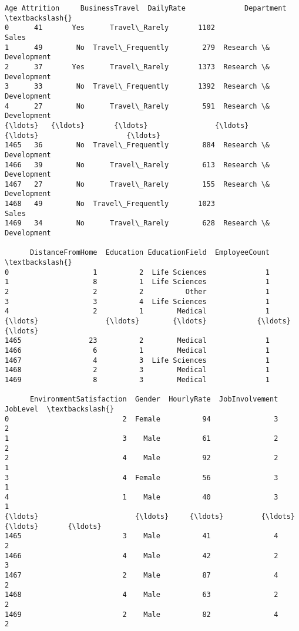 \documentclass[11pt]{article}
\makeatletter
\newcommand{\boxspacing}{\kern\kvtcb@left@rule\kern\kvtcb@boxsep}
\newcommand{\prompt}[4]{
        {\ttfamily\llap{{\color{#2}[#3]:\hspace{3pt}#4}}\vspace{-\baselineskip}}
    }
\makeatother
\begin{document}
            \begin{tcolorbox}[breakable, size=fbox, boxrule=.5pt, pad at break*=1mm, opacityfill=0]
\prompt{Out}{outcolor}{84}{\boxspacing}
\begin{Verbatim}[commandchars=\\\{\}]
      Age Attrition     BusinessTravel  DailyRate              Department  \textbackslash{}
0      41       Yes      Travel\_Rarely       1102                   Sales
1      49        No  Travel\_Frequently        279  Research \& Development
2      37       Yes      Travel\_Rarely       1373  Research \& Development
3      33        No  Travel\_Frequently       1392  Research \& Development
4      27        No      Travel\_Rarely        591  Research \& Development
{\ldots}   {\ldots}       {\ldots}                {\ldots}        {\ldots}                     {\ldots}
1465   36        No  Travel\_Frequently        884  Research \& Development
1466   39        No      Travel\_Rarely        613  Research \& Development
1467   27        No      Travel\_Rarely        155  Research \& Development
1468   49        No  Travel\_Frequently       1023                   Sales
1469   34        No      Travel\_Rarely        628  Research \& Development

      DistanceFromHome  Education EducationField  EmployeeCount  \textbackslash{}
0                    1          2  Life Sciences              1
1                    8          1  Life Sciences              1
2                    2          2          Other              1
3                    3          4  Life Sciences              1
4                    2          1        Medical              1
{\ldots}                {\ldots}        {\ldots}            {\ldots}            {\ldots}
1465                23          2        Medical              1
1466                 6          1        Medical              1
1467                 4          3  Life Sciences              1
1468                 2          3        Medical              1
1469                 8          3        Medical              1

      EnvironmentSatisfaction  Gender  HourlyRate  JobInvolvement  JobLevel  \textbackslash{}
0                           2  Female          94               3         2
1                           3    Male          61               2         2
2                           4    Male          92               2         1
3                           4  Female          56               3         1
4                           1    Male          40               3         1
{\ldots}                       {\ldots}     {\ldots}         {\ldots}             {\ldots}       {\ldots}
1465                        3    Male          41               4         2
1466                        4    Male          42               2         3
1467                        2    Male          87               4         2
1468                        4    Male          63               2         2
1469                        2    Male          82               4         2


\end{Verbatim}
\end{tcolorbox}
\end{document}
